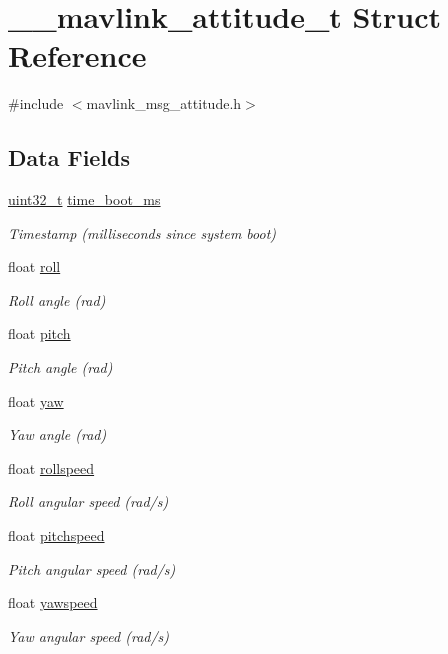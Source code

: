 \hypertarget{struct____mavlink__attitude__t}{\section{\-\_\-\-\_\-mavlink\-\_\-attitude\-\_\-t Struct Reference}
\label{struct____mavlink__attitude__t}
}


{\ttfamily \#include $<$mavlink\-\_\-msg\-\_\-attitude.\-h$>$}

\subsection*{Data Fields}
\begin{DoxyCompactItemize}
\item 
\hyperlink{stdint_8h_a435d1572bf3f880d55459d9805097f62}{uint32\-\_\-t} \hyperlink{struct____mavlink__attitude__t_a7330cabdd19ca8d3dc27ff1a6b585326}{time\-\_\-boot\-\_\-ms}
\begin{DoxyCompactList}\small\item\em Timestamp (milliseconds since system boot) \end{DoxyCompactList}\item 
float \hyperlink{struct____mavlink__attitude__t_a5ac57ac7109bca27a72d5a4128a8010f}{roll}
\begin{DoxyCompactList}\small\item\em Roll angle (rad) \end{DoxyCompactList}\item 
float \hyperlink{struct____mavlink__attitude__t_ad9be17d1bb5941060e7c81634ebec51c}{pitch}
\begin{DoxyCompactList}\small\item\em Pitch angle (rad) \end{DoxyCompactList}\item 
float \hyperlink{struct____mavlink__attitude__t_a24ce486ebd7bde1558ad456684bcbd93}{yaw}
\begin{DoxyCompactList}\small\item\em Yaw angle (rad) \end{DoxyCompactList}\item 
float \hyperlink{struct____mavlink__attitude__t_ae46e19a3dc0bde80d9a0eddbc0f9315d}{rollspeed}
\begin{DoxyCompactList}\small\item\em Roll angular speed (rad/s) \end{DoxyCompactList}\item 
float \hyperlink{struct____mavlink__attitude__t_a6496f9102154455ef47db7c0cab5c141}{pitchspeed}
\begin{DoxyCompactList}\small\item\em Pitch angular speed (rad/s) \end{DoxyCompactList}\item 
float \hyperlink{struct____mavlink__attitude__t_a2a6cd5ab90b6c939dec690ebf7000101}{yawspeed}
\begin{DoxyCompactList}\small\item\em Yaw angular speed (rad/s) \end{DoxyCompactList}\end{DoxyCompactItemize}



